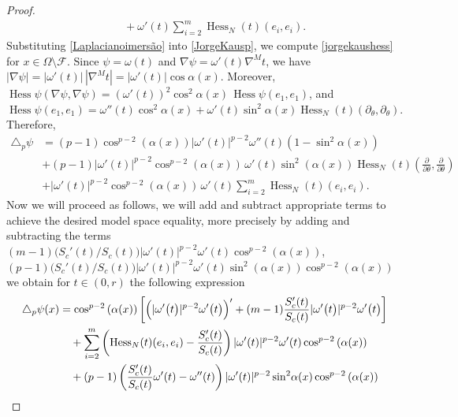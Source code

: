 \documentclass{article}
\begin{document}
\begin{proof}
\begin{equation}
\begin{aligned}
&\quad + \omega'(t)\sum_{i=2}^m 
   \operatorname{Hess}_N(t)(e_i, e_i).
\end{aligned}
\end{equation}
Substituting \eqref{Laplacianoimersão} into \eqref{JorgeKausp}, we compute \eqref{jorgekaushess} for $x\in \Omega\setminus\mathcal F$. Since $\psi=\omega(t)$ and $\nabla\psi=\omega'(t)\nabla^M t$,
we have $|\nabla\psi|=|\omega'(t)|\,|\nabla^M t|
=|\omega'(t)|\cos\alpha(x)$. Moreover, $\operatorname{Hess}\psi(\nabla\psi,\nabla\psi)
=(\omega'(t))^2\cos^2\alpha(x)\, \operatorname{Hess}\psi(e_1,e_1)$, and
$\operatorname{Hess}\psi(e_1,e_1) = \omega''(t)\cos^2\alpha(x) + \omega'(t)\sin^2\alpha(x) \operatorname{Hess}_N(t)(\partial_\theta,\partial_\theta)$. Therefore,
\begin{equation}
\begin{aligned}
     \triangle_p \psi &= (p-1)\cos^{p-2}{(\alpha(x))}|\omega'(t)|^{p-2}\omega''(t)\left(1 - \sin^2{\alpha(x)} \right) \\
     &+(p-1)|\omega'(t)|^{p-2}\cos^{p-2}{(\alpha(x))}\,\omega'(t) \sin^2 \left( \alpha(x) \right) \operatorname{Hess}_N(t)\!\left(\frac{\partial}{\partial\theta},
   \frac{\partial}{\partial\theta}\right) \\
   &+ |\omega'(t)|^{p-2}\cos^{p-2}{(\alpha(x))}\, \omega'(t)\sum_{i=2}^m 
   \operatorname{Hess}_N(t)(e_i, e_i). 
\end{aligned}
\end{equation}
Now we will proceed as follows, we will add and subtract appropriate terms to achieve the desired model space equality, more precisely by adding and subtracting the terms $(m-1)\bigl(S_c'(t)/S_c(t)\bigr)|\omega'(t)|^{p-2}\omega'(t)\cos^{p-2}{\left(\alpha(x)\right)}$, $(p-1)\bigl(S_c'(t)/S_c(t)\bigr)|\omega'(t)|^{p-2}\omega'(t)\sin^2{\left(\alpha(x)\right)}\cos^{p-2}{\left(\alpha(x)\right)}$ we obtain  for $t\in(0,r)$  the following expression
\begin{equation}\label{pLaplacianoimersão}
\begin{aligned}
\triangle_p \psi(x)
&=  \cos^{p-2}{\left(\alpha(x)\right)}\left[ \Bigl(|\omega' \bigl(t \bigr)|^{p-2} \omega' \bigl(t\bigr)\Bigr)' +  (m-1)\frac{S'_c(t)}{S_c(t)} |\omega' \bigl(t\bigr)|^{p-2} \omega' \bigl(t\bigr) \right] \\
&\quad + \sum_{i=2}^m \left( \operatorname{Hess}_N(t)(e_i, e_i) - \frac{S'_c(t)}{S_c(t)}\right)|\omega' (t)|^{p-2} \omega'(t)\cos^{p-2}{\left(\alpha(x)\right)} \\
&\quad + (p-1)\left(\frac{S'_c(t)}{S_c(t)}\omega'(t) - \omega''(t) \right)  |\omega'(t)|^{p-2} \sin^2\! \alpha(x)\cos^{p-2}{\left(\alpha(x)\right)}  \\

\end{aligned}
\end{equation}
\end{proof}
\end{document}
